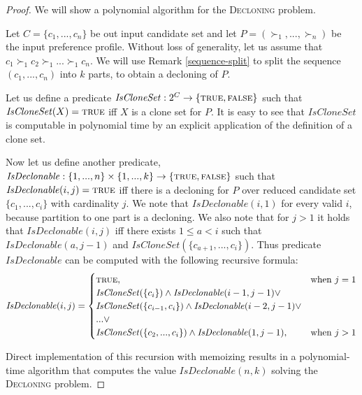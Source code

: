 \begin{proof}
We will show a polynomial algorithm for the \textsc{Decloning} problem.

Let $C = \{c_1, ..., c_n\}$ be out input candidate set
and let $P = (\succ_1, ... , \succ_n)$ be the input preference profile.
Without loss of generality, let us assume that $c_1 \succ_1 c_2 \succ_1 ... \succ_1 c_n$.
We will use Remark \ref{sequence-split} to split the sequence $(c_1, ..., c_n)$
into $k$ parts, to obtain a decloning of $P$.

Let us define a predicate
$\mathit{IsCloneSet}: 2^C \rightarrow \{\text{\textsc{true}},\text{\textsc{false}}\}$
such that $\mathit{IsCloneSet}(X) = \text{\textsc{true}}$ iff $X$ is a clone set for $P$.
It is easy to see that $\mathit{IsCloneSet}$ is computable in polynomial time
by an explicit application of the definition of a clone set.

Now let us define another predicate,
$\mathit{IsDeclonable}: \{1,...,n\}\times\{1,...,k\} \rightarrow \{\text{\textsc{true}},\text{\textsc{false}}\}$
such that $\mathit{IsDeclonable}(i,j) = \text{\textsc{true}}$
iff there is a decloning for $P$ over reduced candidate set $\{c_1,...,c_i\}$
with cardinality $j$.
We note that $\mathit{IsDeclonable}(i, 1)$ for every valid $i$, because partition to one part is a decloning.
We also note that for $j>1$ it holds that $\mathit{IsDeclonable}(i,j)$ iff
there exists $1 \leq a < i$ such that $\mathit{IsDeclonable}(a,j-1)$ and $\mathit{IsCloneSet}(\{c_{a+1}, ..., c_i\})$.
Thus predicate $\mathit{IsDeclonable}$ can be computed with the following recursive formula:
$$ \mathit{IsDeclonable}(i,j) =
\begin{cases}
\text{\textsc{true}},	&\text{when $j=1$} \\
\mathit{IsCloneSet}(\{c_i\}) \wedge \mathit{IsDeclonable}(i-1,j-1) \vee \\
\mathit{IsCloneSet}(\{c_{i-1},c_i\}) \wedge \mathit{IsDeclonable}(i-2, j-1) \vee \\
... \vee \\
\mathit{IsCloneSet}(\{c_2,...,c_i\}) \wedge \mathit{IsDeclonable}(1,j-1)
, 		&\text{when $j>1$}
\end{cases}
$$

Direct implementation of this recursion with memoizing
results in a polynomial-time algorithm that computes the value $IsDeclonable(n,k)$
solving the \textsc{Decloning} problem.
\end{proof}
